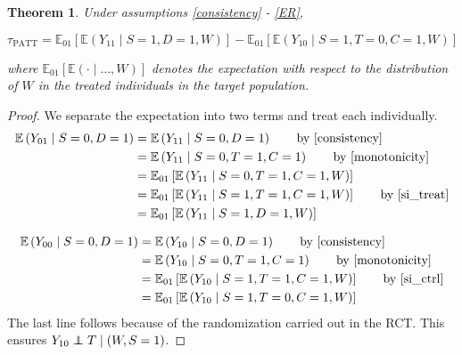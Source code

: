 \documentclass[12pt]{article}
\newtheorem{theorem}{Theorem}
\newcommand{\ex}{\mathbb{E}} %
\newcommand\independent{\protect\mathpalette{\protect\independenT}{\perp}}
\def\independenT#1#2{\mathrel{\rlap{$#1#2$}\mkern2mu{#1#2}}}
\begin{document}
\begin{theorem}\label{thm1}
Under assumptions \eqref{consistency} - \eqref{ER},

$$\tau_{\text{PATT}} = \ex_{01}\left[  \ex\left(Y_{11} \mid S=1, D=1, W\right)\right]
-\ex_{01}\left[  \ex\left(Y_{10} \mid S=1, T=0, C=1, W\right) \right] $$

where $\ex_{01}\left[\ex(\cdot \mid\dots, W)\right]$ denotes the expectation with respect to the distribution of $W$ in the treated individuals in the target population.  
\end{theorem}

\begin{proof}
We separate the expectation into two terms and treat each individually.
\begin{align*}
\ex\left(Y_{01} \mid S=0,D=1\right) &= \ex\left(Y_{11} \mid S=0, D=1\right) \tag*{by \eqref{consistency}} \\
&= \ex\left(Y_{11} \mid S=0, T=1, C=1\right) \tag*{by \eqref{monotonicity}} \\
&= \ex_{01}\left[  \ex\left(Y_{11} \mid S=0, T=1, C=1, W\right) \right] \\
&= \ex_{01}\left[  \ex\left(Y_{11} \mid S=1, T=1, C=1, W\right) \right] \tag*{by \eqref{si_treat}} \\
&= \ex_{01}\left[  \ex\left(Y_{11} \mid S=1, D=1, W\right)\right]
\end{align*}

\begin{align*}
\ex\left(Y_{00} \mid S=0, D=1\right) &= \ex\left(Y_{10} \mid S=0, D=1\right) \tag*{by \eqref{consistency}} \\
&= \ex\left(Y_{10} \mid S=0, T=1, C=1\right) \tag*{by \eqref{monotonicity}} \\
&= \ex_{01}\left[  \ex\left(Y_{10} \mid S=1, T=1, C=1, W\right) \right] \tag*{by \eqref{si_ctrl}} \\
&= \ex_{01}\left[  \ex\left(Y_{10} \mid S=1, T=0, C=1, W\right) \right] \\
\end{align*}
The last line follows because of the randomization carried out in the RCT.  This ensures $Y_{10} \independent T \mid (W, S=1)$.
\end{proof}
\end{document}

